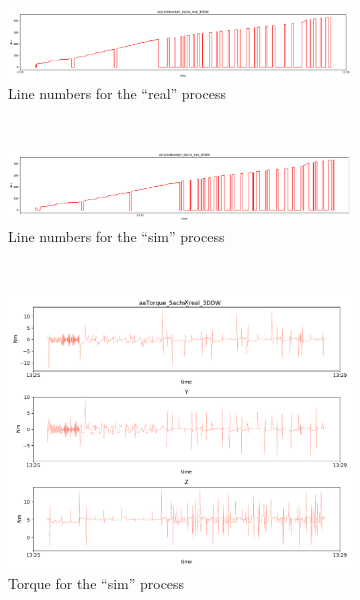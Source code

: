 \documentclass[english]{scrartcl}
\begin{document}
\begin{figure}
    \begin{subfigure}[t]{0.5\textwidth}
        \includegraphics[width=\textwidth]{actLineNumber_real.pdf}
        \caption{Line numbers for the ``real'' process}
        \label{fig:linenumbers-real}
    \end{subfigure}%
    ~
    \begin{subfigure}[t]{0.5\textwidth}
        \includegraphics[width=\textwidth]{actLineNumber_sim.pdf}
        \caption{Line numbers for the ``sim'' process}
        \label{fig:linenumbers-sim}
    \end{subfigure}%
    \\
    \begin{subfigure}[t]{0.5\textwidth}
        \includegraphics[width=\textwidth]{real_torque.pdf}
        \caption{Torque for the ``sim'' process}
    \end{subfigure}%
    ~
    \begin{subfigure}[t]{0.5\textwidth}

\end{subfigure}
\end{figure}
\end{document}
